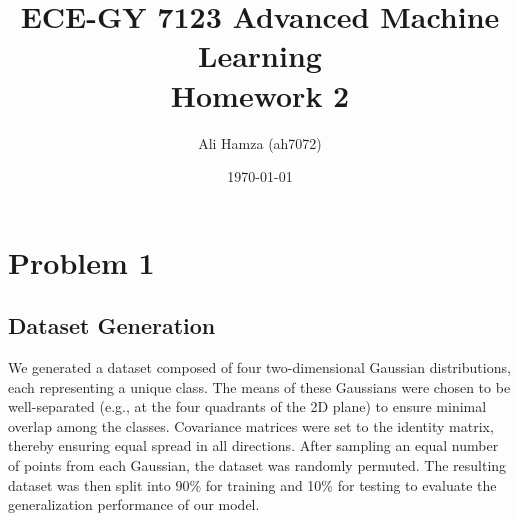 \documentclass{article}
\title{ECE-GY 7123 Advanced Machine Learning \\ \Large Homework 2}
\author{Ali Hamza (ah7072)}
\date{\today}
\begin{document}
\maketitle

\section*{Problem 1}
\subsection*{Dataset Generation}
We generated a dataset composed of four two-dimensional Gaussian distributions, each representing a unique class. The means of these Gaussians were chosen to be well-separated (e.g., at the four quadrants of the 2D plane) to ensure minimal overlap among the classes. Covariance matrices were set to the identity matrix, thereby ensuring equal spread in all directions. After sampling an equal number of points from each Gaussian, the dataset was randomly permuted. The resulting dataset was then split into 90\% for training and 10\% for testing to evaluate the generalization performance of our model.
\end{document}
